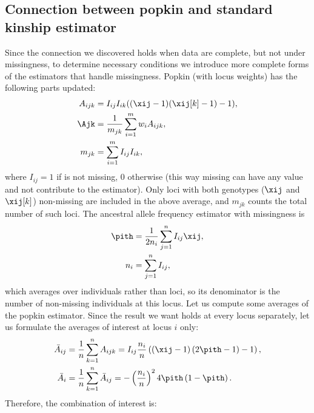 \documentclass[11pt]{article}
\begin{document}
\begin{appendices}
  \section{Connection between popkin and standard kinship estimator}

  \label{sec:conn_popkin_std}  

  Since the connection we discovered holds when data are complete, but not under missingness, to determine necessary conditions we introduce more complete forms of the estimators that handle missingness.
  Popkin (with locus weights) has the following parts updated:
  \begin{equation*}
    \begin{split}
      A_{ijk}
      &=
        I_{ij} I_{ik} ( (\xij-1)(\xij[k]-1) - 1 )
      , \\
      \Ajk
      &=
        \frac{1}{m_{jk}} \sum_{i=1}^m w_i A_{ijk}
        , \\
      m_{jk}
      &=
        \sum_{i=1}^m I_{ij} I_{ik}
        ,
    \end{split}
  \end{equation*}
  where $I_{ij} = 1$ if \xij is not missing, 0 otherwise (this way missing \xij can have any value and not contribute to the estimator).
  Only loci with both genotypes ($\xij$ and $\xij[k]$) non-missing are included in the above average, and $m_{jk}$ counts the total number of such loci.
  The ancestral allele frequency estimator with missingness is
  \begin{align*}
    \pith
    &=
      \frac{1}{2 n_i} \sum_{j=1}^n I_{ij} \xij
      , \\
    n_i
    &=
      \sum_{j=1}^n I_{ij}
      ,
  \end{align*}
  which averages over individuals rather than loci, so its denominator is the number of non-missing individuals at this locus.
  Let us compute some averages of the popkin estimator.
  Since the result we want holds at every locus separately, let us formulate the averages of interest at locus $i$ only:
  \begin{align*}
    \bar{A}_{ij}
    &=
      \frac{1}{n} \sum_{k=1}^n A_{ijk}
      =
      I_{ij} \frac{n_i}{n} \left( ( \xij - 1 ) \left( 2 \pith - 1 \right) - 1 \right)
      , \\
    \bar{A}_i
    &=
      \frac{1}{n} \sum_{k=1}^n \bar{A}_{ij}
      =
      - \left( \frac{n_i}{n} \right)^2 4 \pith \left( 1 - \pith \right)
      .
  \end{align*}
  Therefore, the combination of interest is:

\end{appendices}
\end{document}

